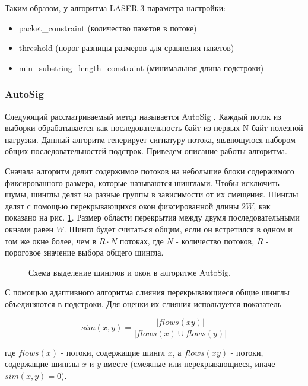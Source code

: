Таким образом, у алгоритма LASER 3 параметра настройки:
\begin{itemize}
    \item packet\_constraint (количество пакетов в потоке)
    \item threshold (порог разницы размеров для сравнения пакетов)
    \item min\_substring\_length\_constraint (минимальная длина подстроки)
\end{itemize}

\subsubsection{AutoSig}

Следующий рассматриваемый метод называется AutoSig \cite{ye2009autosig, santosautomatic}.
Каждый поток из выборки обрабатывается как последовательность байт из первых N байт полезной нагрузки.
Данный алгоритм генерирует сигнатуру-потока, являющуюся набором общих последовательностей подстрок.
Приведем описание работы алгоритма.

Сначала алгоритм делит содержимое потоков на небольшие блоки содержимого фиксированного размера, которые называются шинглами.
Чтобы исключить шумы, шинглы делят на разные группы в зависимости от их смещения. Шинглы делят с помощью перекрывающихся окон фиксированной длины $2W$,
как показано на рис. \ref{autosig:shingles}. Размер области перекрытия между двумя последовательными окнами равен $W$.
Шингл будет считаться общим, если он встретился в одном и том же окне более, чем в $R \cdot N$ потоках,
где $N$ - количество потоков, $R$ - пороговое значение выбора общего шингла.

\begin{figure}[h!]
    \begin{center}
        
        \caption{Схема выделение шинглов и окон в алгоритме AutoSig.}\label{autosig:shingles}
    \end{center}
\end{figure}

С помощью адаптивного алгоритма слияния перекрывающиеся общие шинглы объединяются в подстроки.
Для оценки их слияния используется показатель

$$ sim(x, y) = \frac{|flows(xy)|}{|flows(x) \cup flows(y)|} $$

где $flows(x)$ - потоки, содержащие шингл $x$, а $flows(xy)$ - потоки, содержащие шинглы $x$ и $y$ вместе (смежные или перекрывающиеся, иначе $sim(x, y) = 0$).

